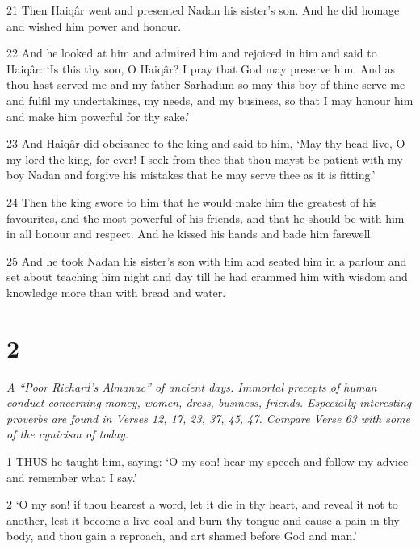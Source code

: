 \par 21 Then Haiqâr went and presented Nadan his sister's son. And he did homage and wished him power and honour.

\par 22 And he looked at him and admired him and rejoiced in him and said to Haiqâr: ‘Is this thy son, O Haiqâr? I pray that God may preserve him. And as thou hast served me and my father Sarhadum so may this boy of thine serve me and fulfil my undertakings, my needs, and my business, so that I may honour him and make him powerful for thy sake.’

\par 23 And Haiqâr did obeisance to the king and said to him, ‘May thy head live, O my lord the king, for ever! I seek from thee that thou mayst be patient with my boy Nadan and forgive his mistakes that he may serve thee as it is fitting.’

\par 24 Then the king swore to him that he would make him the greatest of his favourites, and the most powerful of his friends, and that he should be with him in all honour and respect. And he kissed his hands and bade him farewell.

\par 25 And he took Nadan his sister's son with him and seated him in a parlour and set about teaching him night and day till he had crammed him with wisdom and knowledge more than with bread and water.



\chapter{2}

\par \textit{A “Poor Richard's Almanac” of ancient days. Immortal precepts of human conduct concerning money, women, dress, business, friends. Especially interesting proverbs are found in Verses 12, 17, 23, 37, 45, 47. Compare Verse 63 with some of the cynicism of today.}

\par 1 THUS he taught him, saying: ‘O my son! hear my speech and follow my advice and remember what I say.’

\par 2 ‘O my son! if thou hearest a word, let it die in thy heart, and reveal it not to another, lest it become a live coal and burn thy tongue and cause a pain in thy body, and thou gain a reproach, and art shamed before God and man.’

